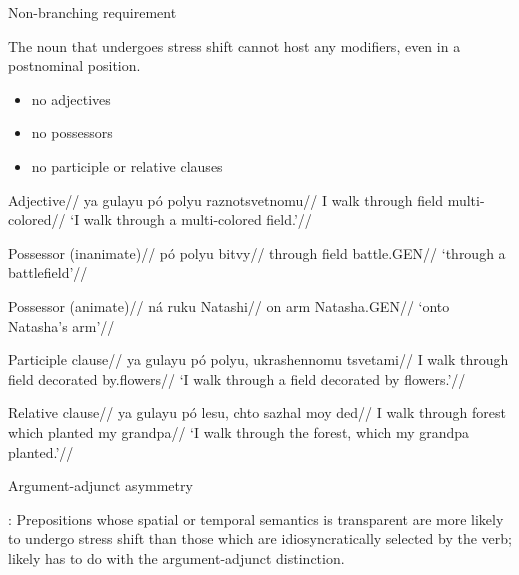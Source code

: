 \documentclass{beamer}
\begin{document}
	\begin{frame}{Non-branching requirement}

		The noun that undergoes stress shift cannot host any modifiers, even in a postnominal position.
		
		\begin{itemize}
			\item no adjectives
			\item no possessors
			\item no participle or relative clauses
		\end{itemize}

	\end{frame}

	\begin{frame}
	
		\ex
			\begingl 
				\glpreamble Adjective//
				\gla *ya gulayu pó polyu raznotsvetnomu//
				\glb I walk through field multi-colored//
				\glft `I walk through a multi-colored field.'//
			\endgl
		\xe

	\end{frame}
	
	\begin{frame}
	
		\ex
			\begingl 
				\glpreamble Possessor (inanimate)//
				\gla *pó polyu bitvy//
				\glb through field battle.GEN//
				\glft `through a battlefield'//
			\endgl
		\xe
		
		\ex
			\begingl 
				\glpreamble Possessor (animate)//
				\gla *ná ruku Natashi//
				\glb on arm Natasha.GEN//
				\glft `onto Natasha's arm'//
			\endgl
		\xe


	\end{frame}

	\begin{frame}
	
		\ex
			\begingl 
				\glpreamble Participle clause//
				\gla *ya gulayu pó polyu, ukrashennomu tsvetami//
				\glb I walk through field decorated by.flowers//
				\glft `I walk through a field decorated by flowers.'//
			\endgl
		\xe
		
		\ex
			\begingl 
				\glpreamble Relative clause//
				\gla ya gulayu pó lesu, chto sazhal moy ded//
				\glb I walk through forest which planted my grandpa//
				\glft `I walk through the forest, which my grandpa planted.'//
			\endgl
		\xe

	\end{frame}
	
	\begin{frame}{Argument-adjunct asymmetry}

		\textcite{Blumenfeld:2011}: Prepositions whose spatial or temporal semantics is transparent are
more likely to undergo stress shift than those which are idiosyncratically selected by the verb; likely has to do with the argument-adjunct distinction.

	\end{frame}
\end{document}
